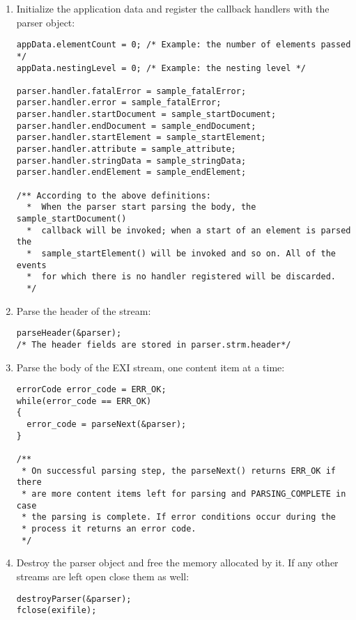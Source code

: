 \begin{enumerate}
 \item Initialize the application data and register the callback handlers with the parser object:
\begin{lstlisting}
appData.elementCount = 0; /* Example: the number of elements passed */
appData.nestingLevel = 0; /* Example: the nesting level */

parser.handler.fatalError = sample_fatalError;
parser.handler.error = sample_fatalError;
parser.handler.startDocument = sample_startDocument;
parser.handler.endDocument = sample_endDocument;
parser.handler.startElement = sample_startElement;
parser.handler.attribute = sample_attribute;
parser.handler.stringData = sample_stringData;
parser.handler.endElement = sample_endElement;

/** According to the above definitions:
  *  When the parser start parsing the body, the sample_startDocument()
  *  callback will be invoked; when a start of an element is parsed the
  *  sample_startElement() will be invoked and so on. All of the events
  *  for which there is no handler registered will be discarded. 
  */
\end{lstlisting}

 \item Parse the header of the stream:
\begin{lstlisting}
parseHeader(&parser);
/* The header fields are stored in parser.strm.header*/
\end{lstlisting}

 \item Parse the body of the EXI stream, one content item at a time:
\begin{lstlisting}
errorCode error_code = ERR_OK;
while(error_code == ERR_OK)
{
  error_code = parseNext(&parser);
}

/**
 * On successful parsing step, the parseNext() returns ERR_OK if there
 * are more content items left for parsing and PARSING_COMPLETE in case
 * the parsing is complete. If error conditions occur during the
 * process it returns an error code.
 */
\end{lstlisting}

 \item Destroy the parser object and free the memory allocated by it. If any other
streams are left open close them as well:
\begin{lstlisting}
destroyParser(&parser);
fclose(exifile);
\end{lstlisting}

\end{enumerate}
